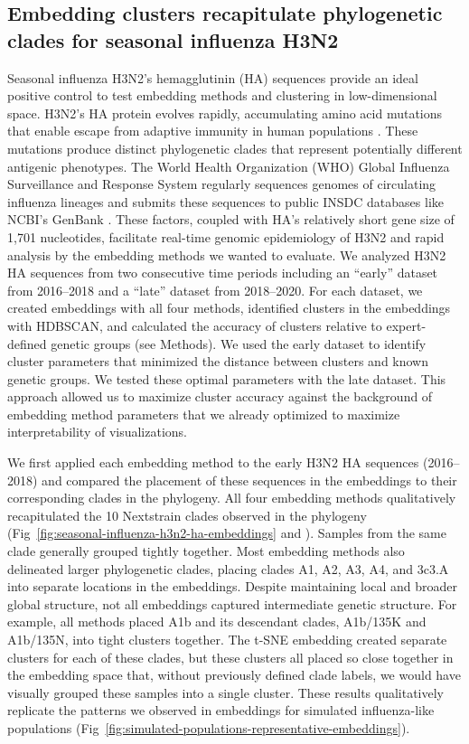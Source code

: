 \documentclass[10pt,letterpaper]{article}
\begin{document}
\subsection*{Embedding clusters recapitulate phylogenetic clades for seasonal influenza H3N2}

Seasonal influenza H3N2's hemagglutinin (HA) sequences provide an ideal positive control to test embedding methods and clustering in low-dimensional space.
H3N2's HA protein evolves rapidly, accumulating amino acid mutations that enable escape from adaptive immunity in human populations \cite{Petrova2018}.
These mutations produce distinct phylogenetic clades that represent potentially different antigenic phenotypes.
The World Health Organization (WHO) Global Influenza Surveillance and Response System regularly sequences genomes of circulating influenza lineages \cite{Hay2018} and submits these sequences to public INSDC databases like NCBI's GenBank \cite{Arita2021}.
These factors, coupled with HA's relatively short gene size of 1,701 nucleotides, facilitate real-time genomic epidemiology of H3N2 \cite{Neher2015} and rapid analysis by the embedding methods we wanted to evaluate.
We analyzed H3N2 HA sequences from two consecutive time periods including an ``early'' dataset from 2016--2018 and a ``late'' dataset from 2018--2020.
For each dataset, we created embeddings with all four methods, identified clusters in the embeddings with HDBSCAN, and calculated the accuracy of clusters relative to expert-defined genetic groups (see Methods).
We used the early dataset to identify cluster parameters that minimized the distance between clusters and known genetic groups.
We tested these optimal parameters with the late dataset.
This approach allowed us to maximize cluster accuracy against the background of embedding method parameters that we already optimized to maximize interpretability of visualizations.

We first applied each embedding method to the early H3N2 HA sequences (2016--2018) and compared the placement of these sequences in the embeddings to their corresponding clades in the phylogeny.
All four embedding methods qualitatively recapitulated the 10 Nextstrain clades observed in the phylogeny (Fig~\ref{fig:seasonal-influenza-h3n2-ha-embeddings} and ).
Samples from the same clade generally grouped tightly together.
Most embedding methods also delineated larger phylogenetic clades, placing clades A1, A2, A3, A4, and 3c3.A into separate locations in the embeddings.
Despite maintaining local and broader global structure, not all embeddings captured intermediate genetic structure.
For example, all methods placed A1b and its descendant clades, A1b/135K and A1b/135N, into tight clusters together.
The t-SNE embedding created separate clusters for each of these clades, but these clusters all placed so close together in the embedding space that, without previously defined clade labels, we would have visually grouped these samples into a single cluster.
These results qualitatively replicate the patterns we observed in embeddings for simulated influenza-like populations (Fig~\ref{fig:simulated-populations-representative-embeddings}).
\end{document}
